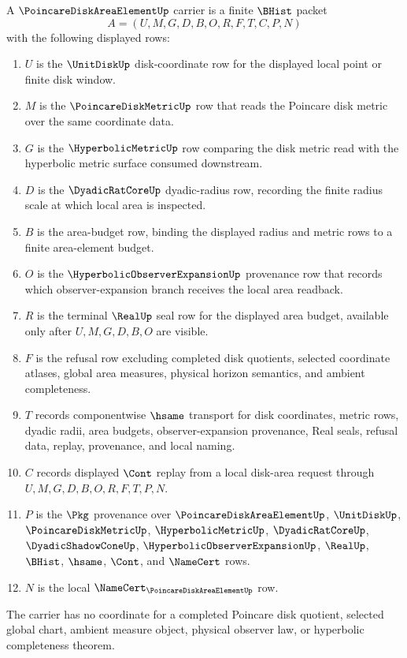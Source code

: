 \begin{definition}
\label{def:poincare-disk-area-element-carrier}
A $\PoincareDiskAreaElementUp$ carrier is a finite $\BHist$ packet
$$
A=(U,M,G,D,B,O,R,F,T,C,P,N)
$$
with the following displayed rows:
\begin{enumerate}
\item $U$ is the $\UnitDiskUp$ disk-coordinate row for the displayed local point or finite disk window.
\item $M$ is the $\PoincareDiskMetricUp$ row that reads the Poincare disk metric over the same coordinate data.
\item $G$ is the $\HyperbolicMetricUp$ row comparing the disk metric read with the hyperbolic metric surface consumed downstream.
\item $D$ is the $\DyadicRatCoreUp$ dyadic-radius row, recording the finite radius scale at which local area is inspected.
\item $B$ is the area-budget row, binding the displayed radius and metric rows to a finite area-element budget.
\item $O$ is the $\HyperbolicObserverExpansionUp$ provenance row that records which observer-expansion branch receives the local area readback.
\item $R$ is the terminal $\RealUp$ seal row for the displayed area budget, available only after $U,M,G,D,B,O$ are visible.
\item $F$ is the refusal row excluding completed disk quotients, selected coordinate atlases, global area measures, physical horizon semantics, and ambient completeness.
\item $T$ records componentwise $\hsame$ transport for disk coordinates, metric rows, dyadic radii, area budgets, observer-expansion provenance, Real seals, refusal data, replay, provenance, and local naming.
\item $C$ records displayed $\Cont$ replay from a local disk-area request through $U,M,G,D,B,O,R,F,T,P,N$.
\item $P$ is the $\Pkg$ provenance over $\PoincareDiskAreaElementUp$, $\UnitDiskUp$, $\PoincareDiskMetricUp$, $\HyperbolicMetricUp$, $\DyadicRatCoreUp$, $\DyadicShadowConeUp$, $\HyperbolicObserverExpansionUp$, $\RealUp$, $\BHist$, $\hsame$, $\Cont$, and $\NameCert$ rows.
\item $N$ is the local $\NameCert_{\PoincareDiskAreaElementUp}$ row.
\end{enumerate}
The carrier has no coordinate for a completed Poincare disk quotient, selected global chart, ambient measure object, physical observer law, or hyperbolic completeness theorem.
\end{definition}

